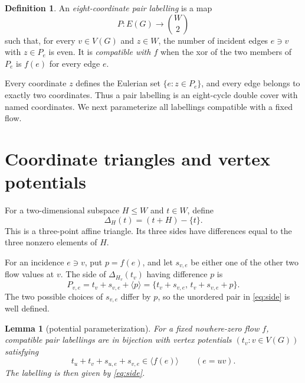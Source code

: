 \documentclass[11pt]{article}
\newtheorem{lemma}[theorem]{Lemma}
\theoremstyle{definition}
\newtheorem{definition}[theorem]{Definition}
\theoremstyle{remark}
\numberwithin{equation}{section}
\begin{document}
\begin{definition}
An \emph{eight-coordinate pair labelling} is a map
\[
                    P:E(G)\longrightarrow \binom W2
\]
such that, for every \(v\in V(G)\) and \(z\in W\), the number of
incident edges \(e\ni v\) with \(z\in P_e\) is even.  It is
\emph{compatible with \(f\)} when the xor of the two members of \(P_e\)
is \(f(e)\) for every edge \(e\).
\end{definition}

Every coordinate \(z\) defines the Eulerian set
\(\{e:z\in P_e\}\), and every edge belongs to exactly two coordinates.
Thus a pair labelling is an eight-cycle double cover with named
coordinates.  We next parameterize all labellings compatible with a
fixed flow.

\section{Coordinate triangles and vertex potentials}

For a two-dimensional subspace \(H\le W\) and \(t\in W\), define
\begin{equation}
                         \Delta_H(t)=(t+H)-\{t\}.
                         \label{eq:triangle}
\end{equation}
This is a three-point affine triangle.  Its three sides have differences
equal to the three nonzero elements of \(H\).

For an incidence \(e\ni v\), put \(p=f(e)\), and let \(s_{v,e}\) be
either one of the other two flow values at \(v\).  The side of
\(\Delta_{H_v}(t_v)\) having difference \(p\) is
\begin{equation}
 P_{v,e}
 =t_v+s_{v,e}+\langle p\rangle
 =\{t_v+s_{v,e},\,t_v+s_{v,e}+p\}.
 \label{eq:side}
\end{equation}
The two possible choices of \(s_{v,e}\) differ by \(p\), so the unordered
pair in \eqref{eq:side} is well defined.

\begin{lemma}[potential parameterization]
\label{lem:potentials}
For a fixed nowhere-zero flow \(f\), compatible pair labellings are in
bijection with vertex potentials \((t_v:v\in V(G))\) satisfying
\begin{equation}
 t_u+t_v+s_{u,e}+s_{v,e}\in\langle f(e)\rangle
 \qquad(e=uv).
 \label{eq:compatibility}
\end{equation}
The labelling is then given by \eqref{eq:side}.
\end{lemma}
\end{document}
